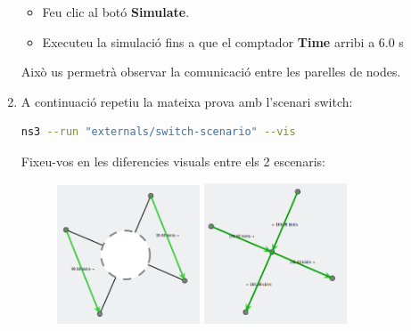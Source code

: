 \documentclass[12pt,a4paper]{article}
\newcounter{exercises}
\newtheorem{exer}[exercises]{Pregunta}
\begin{document}
\begin{enumerate}
\begin{itemize}
 \item Feu clic al botó \textbf{Simulate}.
 \item Executeu la simulació fins a que el comptador \textbf{Time} arribi a 6.0 s
\end{itemize}

Això us permetrà observar la comunicació entre les parelles de nodes.

\item A continuació repetiu la mateixa prova amb l'scenari switch:
\begin{lstlisting}[language=bash]
   ns3 --run "externals/switch-scenario" --vis
\end{lstlisting}

Fixeu-vos en les diferencies visuals entre els 2 escenaris:
\begin{figure}[!ht]
  \begin{center}
    \includegraphics[width=0.4\textwidth]{hub-coms}
    \includegraphics[width=0.4\textwidth]{switch-coms}    
    \label{ns3}
  \end{center}
\end{figure}


\end{enumerate}
\end{document}
